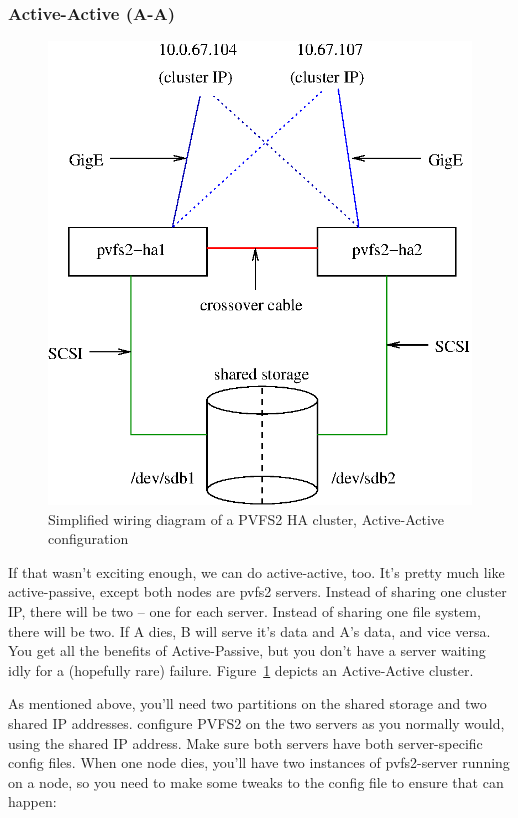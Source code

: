 \documentclass[11pt]{article}
\begin{document}
\subsubsection{Active-Active (A-A)}


\begin{figure}
\begin{center}
\includegraphics[scale=0.75]{pvfs2-failover-AA.eps}
\end{center}
\caption{Simplified wiring diagram of a PVFS2 HA cluster, Active-Active
configuration}
\label{fig:nodes-aa}
\end{figure}

If that wasn't exciting enough, we can do active-active, too.  It's
pretty much like active-passive, except both nodes are pvfs2 servers.
Instead of sharing one cluster IP, there will be two -- one for each
server.  Instead of sharing one file system, there will be two.  If A
dies, B will serve it's data and A's data, and vice versa.  You get all
the benefits of Active-Passive, but you don't have a server waiting idly
for a (hopefully rare) failure.   Figure~\ref{fig:nodes-aa} depicts an
Active-Active cluster.

As mentioned above, you'll need two partitions on the shared storage and
two shared IP addresses.  configure PVFS2 on the two servers as you
normally would, using the shared IP address.  Make sure both servers
have both server-specific config files.  When one node dies, you'll have
two instances of pvfs2-server running on a node, so you need to make
some tweaks to the config file to ensure that can happen: 
\end{document}

